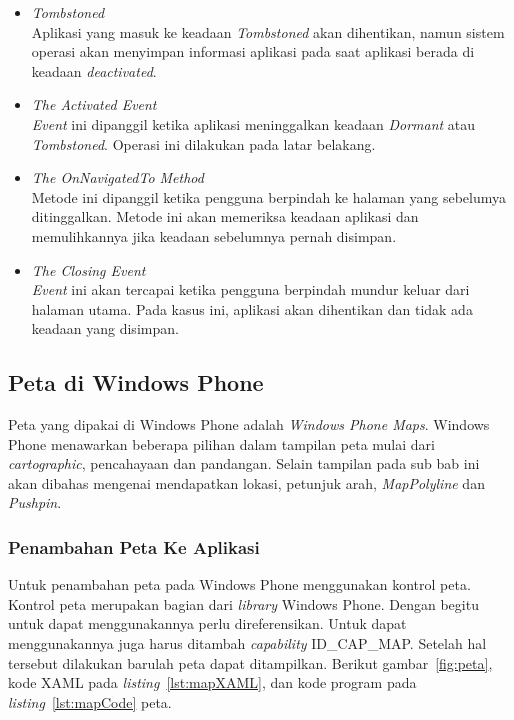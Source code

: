 \begin{itemize}
	\item \textit{Tombstoned} \\
	Aplikasi yang masuk ke keadaan \textit{Tombstoned} akan dihentikan, namun sistem operasi akan menyimpan informasi aplikasi pada saat aplikasi berada di keadaan \textit{deactivated}.
	\item \textit{The Activated Event} \\
	\textit{Event} ini dipanggil ketika aplikasi meninggalkan keadaan \textit{Dormant} atau \textit{Tombstoned}. Operasi ini dilakukan pada latar belakang. 
	\item \textit{The OnNavigatedTo Method} \\
	Metode ini dipanggil ketika pengguna berpindah ke halaman yang sebelumya ditinggalkan. Metode ini akan memeriksa keadaan aplikasi dan memulihkannya jika keadaan sebelumnya pernah disimpan. 
	\item \textit{The Closing Event} \\
	\textit{Event} ini akan tercapai ketika pengguna berpindah mundur keluar dari halaman utama. Pada kasus ini, aplikasi akan dihentikan dan tidak ada keadaan yang disimpan. 
\end{itemize}

\subsection{Peta di Windows Phone}
\label{subsec:Peta di Windows Phone}
\hspace{0.5cm} Peta yang dipakai di Windows Phone adalah \textit{Windows Phone Maps}. Windows Phone menawarkan beberapa pilihan dalam tampilan peta mulai dari \textit{cartographic}, pencahayaan dan pandangan. Selain tampilan pada sub bab ini akan dibahas mengenai mendapatkan lokasi, petunjuk arah, \textit{MapPolyline} dan \textit{Pushpin}\cite{MSDN}.

\subsubsection{Penambahan Peta Ke Aplikasi}
\label{subsubsec:Penambahan Peta Ke Aplikasi}
\hspace{0.5cm} Untuk penambahan peta pada Windows Phone menggunakan kontrol peta. Kontrol peta merupakan bagian dari \textit{library} Windows Phone. Dengan begitu untuk dapat menggunakannya perlu direferensikan. Untuk dapat menggunakannya juga harus ditambah \textit{capability} ID\_CAP\_MAP. Setelah hal tersebut dilakukan barulah peta dapat ditampilkan. Berikut gambar~\ref{fig:peta}, kode XAML pada \textit{listing}~\ref{lst:mapXAML}, dan kode program pada \textit{listing}~\ref{lst:mapCode} peta.

